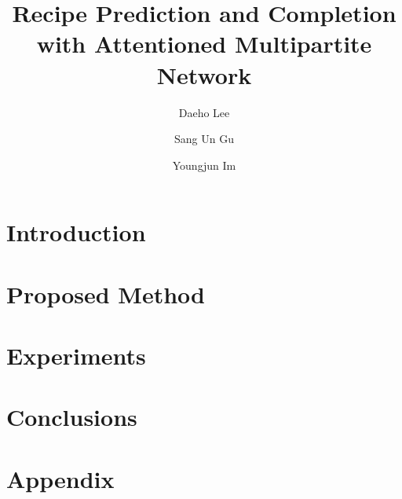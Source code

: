 \documentclass{vldb}
\begin{document}
\newcommand{\beq}{\begin{equation}}
	\newcommand{\eeq}{\end{equation}}
\newcommand{\bit}{\begin{itemize*}}
	\newcommand{\eit}{\end{itemize*}}
\newcommand{\goal}[1]{ {\noindent {$\Rightarrow$} \em {#1} } }
\newcommand{\hide}[1]{}
\newcommand{\comment}[1]{ {\footnotesize {#1} } }


\title{Recipe Prediction and Completion with Attentioned Multipartite Network}


\author{Daeho Lee}

\author{Sang Un Gu}

\author{Youngjun Im}

\maketitle
\begin{abstract}
	
\end{abstract}

\section{Introduction}
\label{sec:intro}


\section{Proposed Method}
\label{sec:proposed}


\section{Experiments}
\label{sec:experiments}


\section{Conclusions}
\label{sec:conclusions}







\newpage
\appendix
\section{Appendix}

\end{document}
